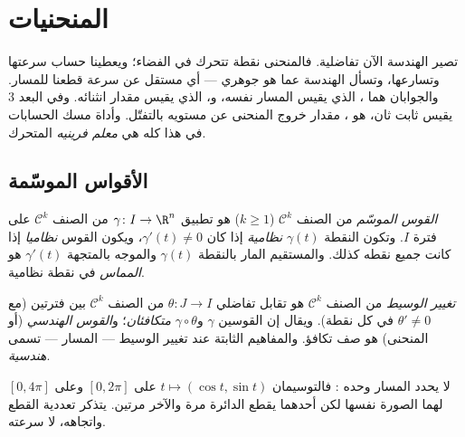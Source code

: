 \chapter{المنحنيات}\label{ch:b2:curves}

تصير الهندسة الآن تفاضلية. فالمنحنى نقطة تتحرك في الفضاء؛ ويعطينا
حساب  سرعتها وتسارعها، وتسأل الهندسة عما هو جوهري --- أي
مستقل عن سرعة قطعنا للمسار. والجوابان هما \emph{}، الذي
يقيس المسار نفسه، و\emph{}، الذي يقيس مقدار انثنائه. وفي
البعد $3$ يقيس ثابت ثان، هو \emph{}، مقدار خروج المنحنى
عن مستويه بالتفتّل. وأداة مسك الحسابات في هذا كله هي \emph{معلم
فرينيه} المتحرك.

\section{الأقواس الموسّمة}

\begin{definition}\label{def:b2:curves:arc}
\emph{القوس الموسّم} من الصنف $\mathcal{C}^k$ ($k \geq 1$) هو تطبيق
$\gamma \colon I \to \R^n$ من الصنف $\mathcal{C}^k$ على فترة $I$. وتكون النقطة $\gamma(t)$
\emph{نظامية} إذا كان $\gamma'(t) \neq 0$، ويكون القوس \emph{نظاميا} إذا كانت
جميع نقطه كذلك. والمستقيم المار بالنقطة $\gamma(t)$ والموجه بالمتجهة
$\gamma'(t)$ هو \emph{المماس} في نقطة نظامية.
\end{definition}

\begin{definition}\label{def:b2:curves:reparam}
\emph{تغيير الوسيط} من الصنف $\mathcal{C}^k$ هو تقابل
تفاضلي $\theta \colon J \to I$ من الصنف $\mathcal{C}^k$ بين فترتين (مع $\theta' \neq 0$ في كل نقطة).
ويقال إن القوسين $\gamma$ و$\gamma \circ \theta$ \emph{متكافئان}؛ و\emph{القوس
الهندسي} (أو المنحنى) هو صف تكافؤ. والمفاهيم
الثابتة عند تغيير الوسيط --- المسار    ---
تسمى \emph{هندسية}.
\end{definition}

\begin{remark}
لا يحدد المسار وحده : فالتوسيمان $t \mapsto (\cos t, \sin t)$ على $[0, 2\pi]$ وعلى
$[0, 4\pi]$ لهما الصورة نفسها لكن أحدهما يقطع الدائرة مرة والآخر مرتين.
 يتذكر تعددية القطع واتجاهه، لا سرعته.
\end{remark}

